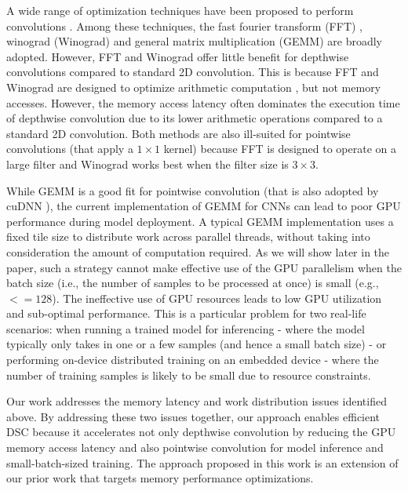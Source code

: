 A wide range of optimization techniques have been proposed to perform convolutions
\cite{Zhen2018Optimizing,liu2019optimizing,winter2019adaptive,li2019autofft,yan2020optimizing,Vasudevan2017Parallel,li2019coordinated,wu2020ugemm}.
Among these techniques, the fast fourier transform (FFT) \cite{li2019autofft}, winograd (Winograd) \cite{yan2020optimizing} and general
matrix multiplication (GEMM) \cite{Vasudevan2017Parallel,li2019coordinated,wu2020ugemm} are broadly adopted. However, FFT and Winograd offer little
benefit for depthwise convolutions compared to standard 2D convolution. This is because FFT and Winograd are designed to optimize
arithmetic computation \cite{zlateski2019anatomy,yan2020optimizing}, but not memory accesses. However, the memory access latency often dominates the execution time of
depthwise convolution \cite{cudaperformance} due to its lower arithmetic operations compared to a standard 2D convolution.  Both methods
are also ill-suited for pointwise convolutions (that apply a $1 \times 1$ kernel) because FFT is designed to operate on a large filter and
Winograd works best when the filter size is $3 \times 3$.

While GEMM is a good fit for pointwise convolution (that is also adopted by cuDNN \cite{ChetlurWVCTCS14}), the current implementation of
GEMM for CNNs can lead to poor GPU performance during model deployment. A typical GEMM implementation uses a fixed tile size to distribute
work across parallel threads, without taking into consideration the amount of computation required. As we will show later in the paper,
such a strategy cannot make effective use of the GPU parallelism when the batch size (i.e., the number of samples to be processed at once)
is small (e.g., $<= 128$). The ineffective use of GPU resources leads to low GPU utilization and sub-optimal performance. This is a
particular problem for two real-life scenarios: when running a trained model for inferencing - where the model typically only takes in one
or a few samples (and hence a small batch size) - or performing on-device distributed training on an embedded device - where the number of
training samples is likely to be small due to resource constraints.

Our work addresses the memory latency and work distribution issues identified above. By addressing these two issues together, our approach
enables efficient DSC because it accelerates not only depthwise convolution by reducing the GPU memory access latency and also pointwise
convolution for model inference and small-batch-sized training. {\color{red}The approach proposed in this work is an extension of our prior work \cite{lu2020optimizing} that targets memory performance optimizations.}


